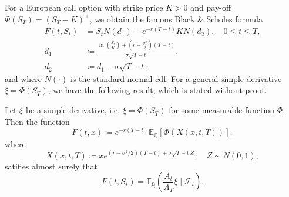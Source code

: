 For a European call option with strike price $K>0$ and pay-off $\Phi(S_{T})=(S_{T}-K)^{+}$, we obtain the famous Black \& Scholes formula
\begin{align}
    F(t,S_{t})&=S_{t}N(d_{1})-e^{-r(T-t)}KN(d_{2}),\quad 0\leq t\leq T,\label{BSFormula}\\
    d_{1}&\coloneqq \frac{\ln\left(\frac{S_{t}}{K}\right)+\left(r+\frac{\sigma^{2}}{2}\right)(T-t)}{\sigma\sqrt{T-t}},\\
    d_{2}&\coloneqq d_{1}-\sigma\sqrt{T-t},
\end{align}
and where $N(\cdot)$ is the standard normal cdf. For a general simple derivative $\xi=\Phi(S_{T})$, we have the following result, which is stated without proof.
\begin{thm}
    Let $\xi$ be a simple derivative, i.e. $\xi=\Phi(S_{T})$ for some measurable function $\Phi$. Then the function
    \begin{equation}
        F(t,x)\coloneqq e^{-r(T-t)}\mathbb{E}_{\mathbb{Q}}\left[\Phi(X(x,t,T))\right],
    \end{equation}
    where 
    \begin{equation}
        X(x,t,T)\coloneqq xe^{(r-\sigma^{2}/2)(T-t)+\sigma\sqrt{T-t}Z},\quad Z\sim N(0,1),
    \end{equation}
satifies almost surely that
\begin{equation}
    F(t,S_{t})=\mathbb{E}_{\mathbb{Q}}\left(\frac{A_{t}}{A_{T}}\xi \mid \mathcal{F}_{t}\right).
\end{equation}
\end{thm}
